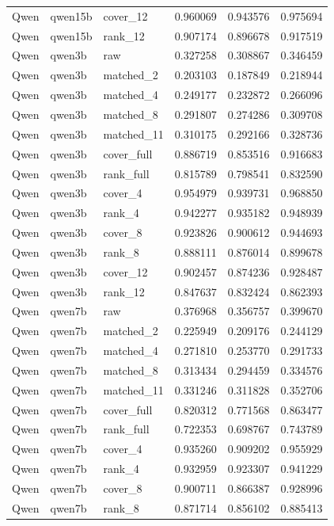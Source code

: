 \begin{tabular}{lllrrr}
Qwen & qwen15b & cover_12 & 0.960069 & 0.943576 & 0.975694 \\
Qwen & qwen15b & rank_12 & 0.907174 & 0.896678 & 0.917519 \\
Qwen & qwen3b & raw & 0.327258 & 0.308867 & 0.346459 \\
Qwen & qwen3b & matched_2 & 0.203103 & 0.187849 & 0.218944 \\
Qwen & qwen3b & matched_4 & 0.249177 & 0.232872 & 0.266096 \\
Qwen & qwen3b & matched_8 & 0.291807 & 0.274286 & 0.309708 \\
Qwen & qwen3b & matched_11 & 0.310175 & 0.292166 & 0.328736 \\
Qwen & qwen3b & cover_full & 0.886719 & 0.853516 & 0.916683 \\
Qwen & qwen3b & rank_full & 0.815789 & 0.798541 & 0.832590 \\
Qwen & qwen3b & cover_4 & 0.954979 & 0.939731 & 0.968850 \\
Qwen & qwen3b & rank_4 & 0.942277 & 0.935182 & 0.948939 \\
Qwen & qwen3b & cover_8 & 0.923826 & 0.900612 & 0.944693 \\
Qwen & qwen3b & rank_8 & 0.888111 & 0.876014 & 0.899678 \\
Qwen & qwen3b & cover_12 & 0.902457 & 0.874236 & 0.928487 \\
Qwen & qwen3b & rank_12 & 0.847637 & 0.832424 & 0.862393 \\
Qwen & qwen7b & raw & 0.376968 & 0.356757 & 0.399670 \\
Qwen & qwen7b & matched_2 & 0.225949 & 0.209176 & 0.244129 \\
Qwen & qwen7b & matched_4 & 0.271810 & 0.253770 & 0.291733 \\
Qwen & qwen7b & matched_8 & 0.313434 & 0.294459 & 0.334576 \\
Qwen & qwen7b & matched_11 & 0.331246 & 0.311828 & 0.352706 \\
Qwen & qwen7b & cover_full & 0.820312 & 0.771568 & 0.863477 \\
Qwen & qwen7b & rank_full & 0.722353 & 0.698767 & 0.743789 \\
Qwen & qwen7b & cover_4 & 0.935260 & 0.909202 & 0.955929 \\
Qwen & qwen7b & rank_4 & 0.932959 & 0.923307 & 0.941229 \\
Qwen & qwen7b & cover_8 & 0.900711 & 0.866387 & 0.928996 \\
Qwen & qwen7b & rank_8 & 0.871714 & 0.856102 & 0.885413 \\

\end{tabular}
